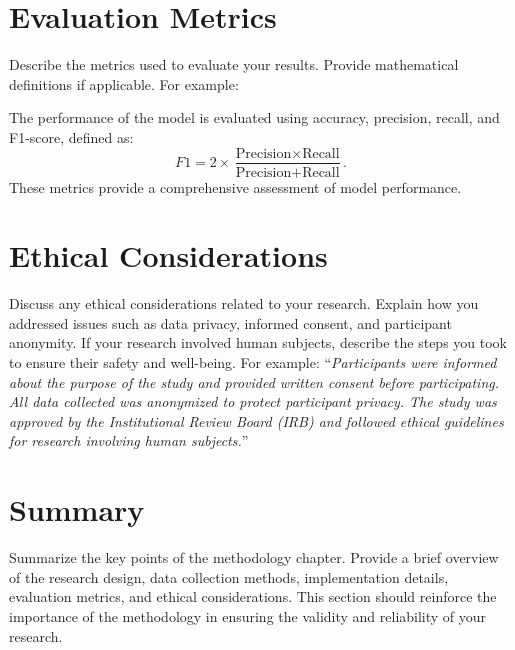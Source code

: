 \section{Evaluation Metrics}\label{sec:evaluation-metrics}
Describe the metrics used to evaluate your results. Provide mathematical definitions if applicable. For example:

The performance of the model is evaluated using accuracy, precision, recall, and F1-score, defined as:
\begin{equation}
    F1 = 2 \times \frac{\text{Precision} \times \text{Recall}}{\text{Precision} + \text{Recall}}.
\end{equation}
These metrics provide a comprehensive assessment of model performance.

\section{Ethical Considerations}\label{sec:ethical-considerations}
Discuss any ethical considerations related to your research. Explain how you addressed issues such as data privacy, informed consent, and participant anonymity. If your research involved human subjects, describe the steps you took to ensure their safety and well-being. For example: ``\textit{Participants were informed about the purpose of the study and provided written consent before participating. All data collected was anonymized to protect participant privacy. The study was approved by the Institutional Review Board (IRB) and followed ethical guidelines for research involving human subjects.}''

\section{Summary}\label{sec:methodology-summary}
Summarize the key points of the methodology chapter. Provide a brief overview of the research design, data collection methods, implementation details, evaluation metrics, and ethical considerations. This section should reinforce the importance of the methodology in ensuring the validity and reliability of your research.
